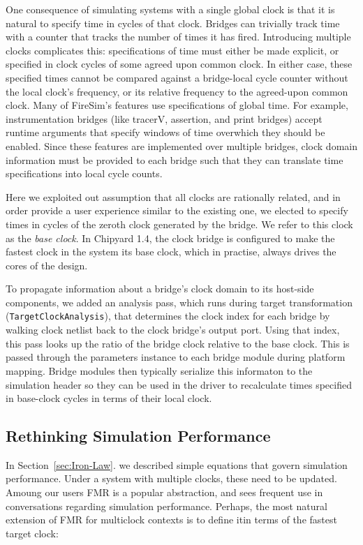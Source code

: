 One consequence of simulating systems with a single global clock is that it is
natural to specify time in cycles of that clock. Bridges can trivially track
time with a counter that tracks the number of times it has fired. Introducing
multiple clocks complicates this: specifications of time must either be made
explicit, or specified in clock cycles of some agreed upon common clock. In
either case, these specified times cannot be compared against a bridge-local
cycle counter without the local clock's frequency, or its relative frequency to
the agreed-upon common clock. Many of FireSim's features use specifications of global time. For example,
instrumentation bridges (like tracerV, assertion, and print bridges) accept
runtime arguments that specify windows of time overwhich they should be
enabled. Since these features are implemented over multiple bridges, clock domain information must be provided to each
bridge such that they can translate time specifications into local cycle counts.

Here we exploited out assumption that all clocks are rationally related, and in
order provide a user experience similar to the existing one, we elected to
specify times in cycles of the zeroth clock generated by the bridge. We refer
to this clock as the \emph{base clock}. In Chipyard 1.4, the clock bridge is
configured to make the fastest clock in the system its base clock, which in
practise, always drives the cores of the design.

To propagate information about a bridge's clock domain to its host-side
components, we added an analysis pass, which runs during target transformation
(\texttt{TargetClockAnalysis}), that determines the clock index for each bridge
by walking clock netlist back to the clock bridge's output port. Using that
index, this pass looks up the ratio of the bridge clock relative to the base
clock. This is passed through the parameters instance to each bridge module
during platform mapping. Bridge modules then typically serialize this informaton to the
simulation header so they can be used in the driver to recalculate times
specified in base-clock cycles in terms of their local clock.

\subsection{Rethinking Simulation Performance}

In Section~\ref{sec:Iron-Law}. we described simple equations that govern
simulation performance.  Under a system with multiple clocks, these need to be
updated. Amoung our users FMR is a popular abstraction, and sees frequent use
in conversations regarding simulation performance. Perhaps, the most natural
extension of FMR for multiclock contexts is to define itin terms of the fastest
target clock:

